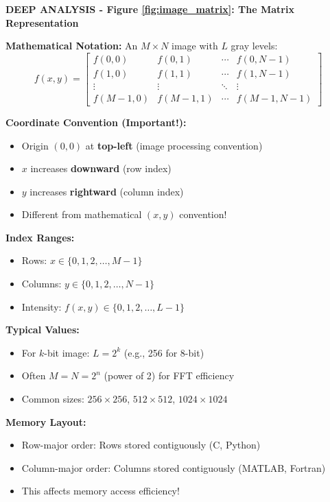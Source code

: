 \documentclass[12pt,a4paper]{article}
\begin{document}
\begin{deepexplanation}
\textbf{DEEP ANALYSIS - Figure \ref{fig:image_matrix}: The Matrix Representation}

\textbf{Mathematical Notation:}
An $M \times N$ image with $L$ gray levels:
\[
f(x,y) = \begin{bmatrix}
f(0,0) & f(0,1) & \cdots & f(0,N-1) \\
f(1,0) & f(1,1) & \cdots & f(1,N-1) \\
\vdots & \vdots & \ddots & \vdots \\
f(M-1,0) & f(M-1,1) & \cdots & f(M-1,N-1)
\end{bmatrix}
\]

\textbf{Coordinate Convention (Important!):}
\begin{itemize}
    \item Origin $(0,0)$ at \textbf{top-left} (image processing convention)
    \item $x$ increases \textbf{downward} (row index)
    \item $y$ increases \textbf{rightward} (column index)
    \item Different from mathematical $(x,y)$ convention!
\end{itemize}

\textbf{Index Ranges:}
\begin{itemize}
    \item Rows: $x \in \{0, 1, 2, \ldots, M-1\}$
    \item Columns: $y \in \{0, 1, 2, \ldots, N-1\}$
    \item Intensity: $f(x,y) \in \{0, 1, 2, \ldots, L-1\}$
\end{itemize}

\textbf{Typical Values:}
\begin{itemize}
    \item For $k$-bit image: $L = 2^k$ (e.g., 256 for 8-bit)
    \item Often $M = N = 2^n$ (power of 2) for FFT efficiency
    \item Common sizes: $256 \times 256$, $512 \times 512$, $1024 \times 1024$
\end{itemize}

\textbf{Memory Layout:}
\begin{itemize}
    \item Row-major order: Rows stored contiguously (C, Python)
    \item Column-major order: Columns stored contiguously (MATLAB, Fortran)
    \item This affects memory access efficiency!
\end{itemize}
\end{deepexplanation}
\end{document}

